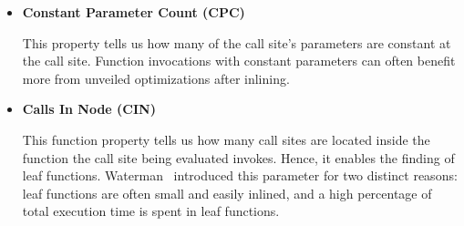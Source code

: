 \begin{itemize}
	\item \textbf{Constant Parameter Count (CPC)}

This property tells us how many of the call site's parameters are constant at
the call site. Function invocations with constant parameters can often benefit
more from unveiled optimizations after inlining.

	\item \textbf{Calls In Node (CIN)}

This function property tells us how many call sites are located inside the
function the call site being evaluated invokes. Hence, it enables the finding of
leaf functions. Waterman~\cite{AdaptvCompilAndInlingWaterman} introduced this
parameter for two distinct reasons: leaf functions are often small and easily
inlined, and a high percentage of total execution time is spent in leaf
functions.

\end{itemize}
